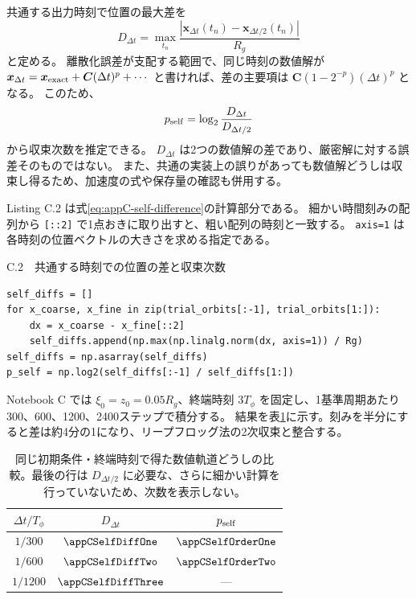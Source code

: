 共通する出力時刻で位置の最大差を
\begin{equation}
 D_{\Delta t}=\max_{t_n}\frac{|\boldsymbol x_{\Delta t}(t_n)-\boldsymbol x_{\Delta t/2}(t_n)|}{R_g}
\label{eq:appC-self-difference}
\end{equation}
と定める。
離散化誤差が支配する範囲で、同じ時刻の数値解が
$\boldsymbol x_{\Delta t}=\boldsymbol x_{\rm exact}+\boldsymbol C(\Delta t)^p+\cdots$
と書ければ、差の主要項は $\boldsymbol C(1-2^{-p})(\Delta t)^p$ となる。
このため、
\begin{equation}
 p_{\rm self}=\log_2\frac{D_{\Delta t}}{D_{\Delta t/2}}
\label{eq:appC-self-order}
\end{equation}
から収束次数を推定できる。
$D_{\Delta t}$ は2つの数値解の差であり、厳密解に対する誤差そのものではない。
また、共通の実装上の誤りがあっても数値解どうしは収束し得るため、加速度の式や保存量の確認も併用する。

Listing C.2 は式\eqref{eq:appC-self-difference}の計算部分である。
細かい時間刻みの配列から \texttt{[::2]} で1点おきに取り出すと、粗い配列の時刻と一致する。
\texttt{axis=1} は各時刻の位置ベクトルの大きさを求める指定である。

\begin{listingbox}{C.2　共通する時刻での位置の差と収束次数}
\begin{Verbatim}[fontsize=\small,xleftmargin=1mm]
self_diffs = []
for x_coarse, x_fine in zip(trial_orbits[:-1], trial_orbits[1:]):
    dx = x_coarse - x_fine[::2]
    self_diffs.append(np.max(np.linalg.norm(dx, axis=1)) / Rg)
self_diffs = np.asarray(self_diffs)
p_self = np.log2(self_diffs[:-1] / self_diffs[1:])
\end{Verbatim}
\end{listingbox}


Notebook C では $\xi_0=z_0=0.05R_g$、終端時刻 $3T_\phi$ を固定し、1基準周期あたり300、600、1200、2400ステップで積分する。
結果を表\ref{tab:appC-self-convergence}に示す。刻みを半分にすると差は約4分の1になり、リープフロッグ法の2次収束と整合する。

\begin{table}[!htbp]
\centering
\caption{同じ初期条件・終端時刻で得た数値軌道どうしの比較。最後の行は $D_{\Delta t/2}$ に必要な、さらに細かい計算を行っていないため、次数を表示しない。}
\label{tab:appC-self-convergence}
\begin{tabular}{ccc}
\toprule
$\Delta t/T_\phi$ & $D_{\Delta t}$ & $p_{\rm self}$ \\
\midrule
$1/300$ & $\appCSelfDiffOne$ & $\appCSelfOrderOne$ \\
$1/600$ & $\appCSelfDiffTwo$ & $\appCSelfOrderTwo$ \\
$1/1200$ & $\appCSelfDiffThree$ & --- \\
\bottomrule
\end{tabular}
\end{table}

